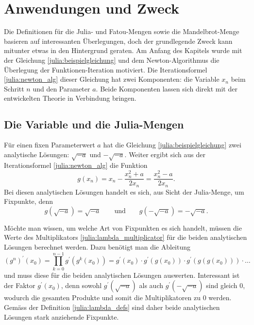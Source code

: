 \section{Anwendungen und Zweck}
\label{julia:zweck}
%

Die Definitionen für die Julia- und Fatou-Mengen sowie die Mandelbrot-Menge basieren auf interessanten Überlegungen, doch der grundlegende Zweck kann mitunter etwas in den Hintergrund geraten.
Am Anfang des Kapitels wurde mit der Gleichung \eqref{julia:beispielgleichung} und dem Newton-Algorithmus die Überlegung der Funktionen-Iteration motiviert.
Die Iterationsformel \eqref{julia:newton_alg} dieser Gleichung hat zwei Komponenten: die Variable $x_n$ beim Schritt $n$ und den Parameter $a$.
Beide Komponenten lassen sich direkt mit der entwickelten Theorie in Verbindung bringen.

\subsection{Die Variable und die Julia-Mengen}
Für einen fixen Parameterwert $a$ hat die Gleichung \eqref{julia:beispielgleichung} zwei analytische Lösungen: $\!\sqrt{-a}$ und $-\!\sqrt{-a}$.
Weiter ergibt sich aus der Iterationsformel \eqref{julia:newton_alg} die Funktion
\begin{equation*}
    g(x_n) = x_n - \frac{x_n^2 + a}{2x_n} = \frac{x_n^2 - a}{2x_n}.
\end{equation*}
Bei diesen analytischen Lösungen handelt es sich, aus Sicht der Julia-Menge, um Fixpunkte, denn
\begin{equation*}
    g(\!\sqrt{-a}) = \!\sqrt{-a} \qquad \text{und} \qquad g(-\!\sqrt{-a}) = -\!\sqrt{-a}.
\end{equation*}

Möchte man wissen, um welche Art von Fixpunkten es sich handelt, müssen die Werte des Multiplikators \eqref{julia:lambda_multiplicator} für die beiden analytischen Lösungen berechnet werden.
Dazu benötigt man die Ableitung
\begin{equation*}
    \left(g^n\right)^\prime(x_0) = \prod_{k=0}^{n-1} g^\prime\left(g^k(x_0)\right) = g^\prime(x_0) \cdot g^\prime(g(x_0)) \cdot g^\prime(g(g(x_0))) \cdot \ldots
\end{equation*}
und muss diese für die beiden analytischen Lösungen auswerten.
Interessant ist der Faktor $g^\prime(x_0)$, denn sowohl $g^\prime(\!\sqrt{-a})$ als auch $g^\prime(-\!\sqrt{-a})$ sind gleich $0$, wodurch die gesamten Produkte und somit die Multiplikatoren zu $0$ werden.
Gemäss der Definition \ref{julia:lambda_defs} sind daher beide analytischen Lösungen stark anziehende Fixpunkte.

